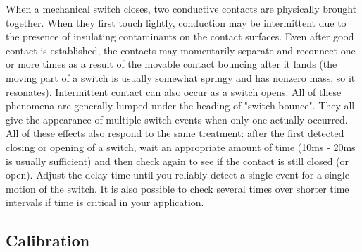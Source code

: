 When a mechanical switch closes, two conductive contacts are
physically brought together.  When they first touch lightly, conduction may be
intermittent due to the presence of insulating contaminants on the
contact surfaces.  Even after good contact is established, the
contacts may momentarily separate and reconnect one or more times as a
result of the movable contact bouncing after it lands (the moving part
of a switch is usually somewhat springy and has nonzero mass, so it
resonates).  Intermittent contact can also occur as a switch opens.
All of these phenomena are generally lumped under the heading of
"switch bounce". They all give the appearance of multiple switch
events when only one actually occurred.  All of these effects also
respond to the same treatment: after the first detected closing or
opening of a switch, wait an appropriate amount of time (10ms - 20ms
is usually sufficient) and then check again to see if the contact is
still closed (or open).  Adjust the delay time until you reliably
detect a single event for a single motion of the switch.  It is also
possible to check several times over shorter time intervals if time is
critical in your application.



\subsection{Calibration}

